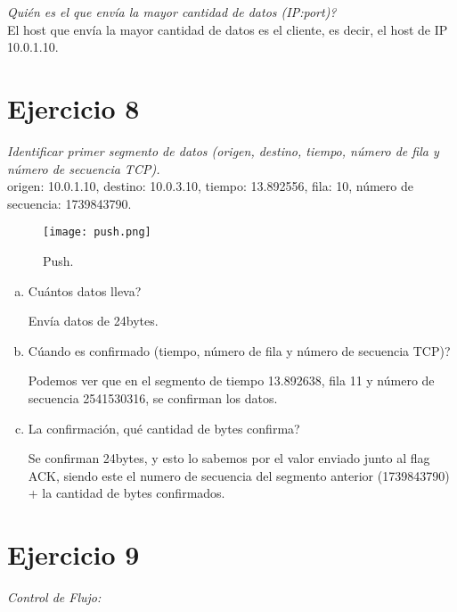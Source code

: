 \documentclass[osajnl,twocolumn,showpacs,superscriptaddress,10pt]{revtex4-1} %
\begin{document}
\textit{Quién es el que envía la mayor cantidad de datos (IP:port)?} \\

El host que envía la mayor cantidad de datos es el cliente, es decir, el host de IP 10.0.1.10.

\section{Ejercicio 8}

\textit{Identificar primer segmento de datos (origen, destino, tiempo, número de fila y número de secuencia TCP).} \\

origen: 10.0.1.10, destino: 10.0.3.10, tiempo: 13.892556, fila: 10, número de secuencia: 1739843790.

\begin{figure}[H]
    \centering
    \texttt{[image: push.png]}
    \caption{Push.}
    \label{push}
\end{figure}

\begin{enumerate}[a)]
    \item Cuántos datos lleva?

    Envía datos de 24bytes.

    \item Cúando es confirmado (tiempo, número de fila y número de secuencia TCP)?

    Podemos ver que en el segmento de tiempo 13.892638, fila 11 y número de secuencia 2541530316,
    se confirman los datos.

    \item La confirmación, qué cantidad de bytes confirma?

    Se confirman 24bytes, y esto lo sabemos por el valor enviado junto al flag ACK, siendo este el numero de secuencia
    del segmento anterior (1739843790) + la cantidad de bytes confirmados.
\end{enumerate}

\section{Ejercicio 9}

\textit{Control de Flujo:}
\end{document}
